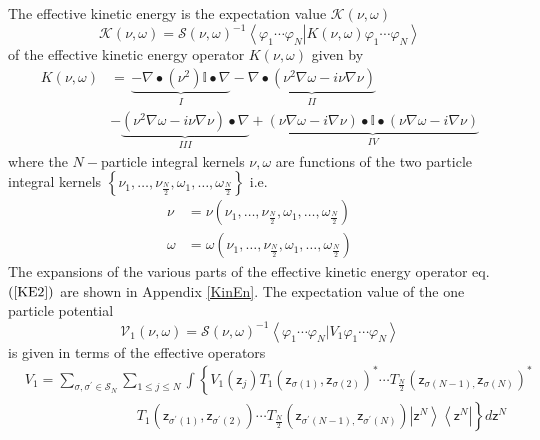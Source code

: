 \documentclass[aps,preprint]{revtex4}%
\begin{document}
The effective kinetic energy is the expectation value $\mathcal{K}\left(
\nu,\omega\right)  $
\begin{equation}
\mathcal{K}\left(  \nu,\omega\right)  =\mathcal{S}\left(  \nu,\omega\right)
^{-1}\left\langle \varphi_{1}\cdots\varphi_{N}\right\vert \left.  K\left(
\nu,\omega\right)  \varphi_{1}\cdots\varphi_{N}\right\rangle
\end{equation}
of the effective kinetic energy operator $K\left(  \nu,\omega\right)  $ given
by%
\begin{align}
K\left(  \nu,\omega\right)   &  =\,\underset{I}{\underbrace{-\nabla
\bullet\left(  \nu^{2}\right)  \mathbb{I}\bullet\nabla}}-\underset
{II}{\underbrace{\nabla\bullet\left(  \nu^{2}\nabla\omega-i\nu\nabla
\nu\right)  }}\nonumber\\
&  -\underset{III}{\underbrace{\left(  \nu^{2}\nabla\omega-i\nu\nabla
\nu\right)  \bullet\nabla}}+\underset{IV}{\underbrace{\left(  \nu\nabla
\omega-i\nabla\nu\right)  \bullet\mathbb{I}\bullet\left(  \nu\nabla
\omega-i\nabla\nu\right)  }} \label{KE2}%
\end{align}
where the $N-$particle integral kernels $\nu,\omega$ are functions of the two
particle integral kernels $\left\{  \nu_{1},\ldots,\nu_{\frac{N}{2}}%
,\omega_{1},\ldots,\omega_{\frac{N}{2}}\right\}  $ i.e.%
\begin{align}
\nu &  =\nu\left(  \nu_{1},\ldots,\nu_{\frac{N}{2}},\omega_{1},\ldots
,\omega_{\frac{N}{2}}\right) \nonumber\\
\omega &  =\omega\left(  \nu_{1},\ldots,\nu_{\frac{N}{2}},\omega_{1}%
,\ldots,\omega_{\frac{N}{2}}\right)
\end{align}
The expansions of the various parts of the effective kinetic energy operator
eq. $\left(  \ref{KE2}\right)  $ are shown in Appendix \ref{KinEn}. The
expectation value of the one particle potential
\begin{equation}
\mathcal{V}_{1}\left(  \nu,\omega\right)  =\mathcal{S}\left(  \nu
,\omega\right)  ^{-1}\left\langle \varphi_{1}\cdots\varphi_{N}\left\vert
V_{1}\right.  \varphi_{1}\cdots\varphi_{N}\right\rangle
\end{equation}
is given in terms of the effective operators%
\begin{align}
&  V_{1}=%
{\displaystyle\sum\limits_{\sigma,\sigma^{\prime}\in\mathcal{S}_{N}}}
{\displaystyle\sum\limits_{1\leq j\leq N}}
\int\left\{  V_{1}\left(  \mathsf{z}_{j}\right)  T_{1}\left(  \mathsf{z}%
_{\sigma\left(  1\right)  },\mathsf{z}_{\sigma\left(  2\right)  }\right)
^{\ast}\cdots T_{\frac{N}{2}}\left(  \mathsf{z}_{\sigma\left(  N-1\right)
,}\mathsf{z}_{\sigma\left(  N\right)  }\right)  ^{\ast}\right. \nonumber\\
&  \qquad\qquad\qquad\qquad\left.  T_{1}\left(  \mathsf{z}_{\sigma^{\prime
}\left(  1\right)  },\mathsf{z}_{\sigma^{\prime}\left(  2\right)  }\right)
\cdots T_{\frac{N}{2}}\left(  \mathsf{z}_{\sigma^{\prime}\left(  N-1\right)
,}\mathsf{z}_{\sigma^{\prime}\left(  N\right)  }\right)  \left\vert
\mathsf{z}^{N}\right\rangle \left\langle \mathsf{z}^{N}\right\vert \right\}
d\mathsf{z}^{N}%
\end{align}
\end{document}

